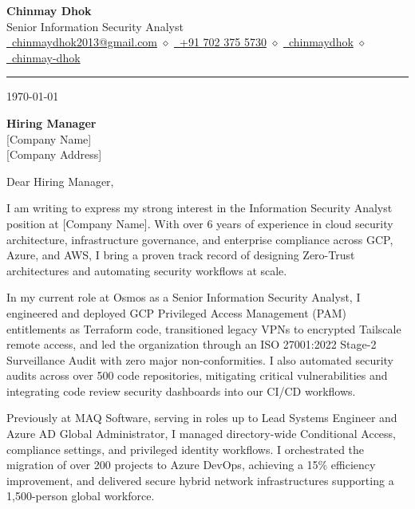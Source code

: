 \documentclass[11pt, letterpaper]{article}
\begin{document}
\begin{center}
    {\Huge\bfseries\color{darktext} Chinmay Dhok} \\[6pt]
    {\large\color{accent} Senior Information Security Analyst} \\[8pt]
    \small\color{graytext}
    \href{mailto:chinmaydhok2013@gmail.com}{\faEnvelope\ chinmaydhok2013@gmail.com}
    \quad$\diamond$\quad
    \href{tel:+917023755730}{\faPhone\ +91 702 375 5730}
    \quad$\diamond$\quad
    \href{https://linkedin.com/in/chinmaydhok}{\faLinkedin\ chinmaydhok}
    \quad$\diamond$\quad
    \href{https://github.com/chinmay-dhok}{\faGithub\ chinmay-dhok}
\end{center}

\vspace{0.2in}

{\color{rulecolor}\hrule}
\vspace{0.3in}

\today

\vspace{0.2in}

\textbf{Hiring Manager} \\
{[}Company Name{]} \\
{[}Company Address{]}

\vspace{0.2in}

Dear Hiring Manager,

\vspace{0.1in}

I am writing to express my strong interest in the Information Security Analyst position at {[}Company Name{]}. With over 6 years of experience in cloud security architecture, infrastructure governance, and enterprise compliance across GCP, Azure, and AWS, I bring a proven track record of designing Zero-Trust architectures and automating security workflows at scale.

In my current role at Osmos as a Senior Information Security Analyst, I engineered and deployed GCP Privileged Access Management (PAM) entitlements as Terraform code, transitioned legacy VPNs to encrypted Tailscale remote access, and led the organization through an ISO 27001:2022 Stage-2 Surveillance Audit with zero major non-conformities. I also automated security audits across over 500 code repositories, mitigating critical vulnerabilities and integrating code review security dashboards into our CI/CD workflows.

Previously at MAQ Software, serving in roles up to Lead Systems Engineer and Azure AD Global Administrator, I managed directory-wide Conditional Access, compliance settings, and privileged identity workflows. I orchestrated the migration of over 200 projects to Azure DevOps, achieving a 15\% efficiency improvement, and delivered secure hybrid network infrastructures supporting a 1,500-person global workforce.
\end{document}
